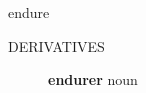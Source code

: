 \documentclass[avery5372, grid]{flashcards}
\begin{document}
\begin{flashcard}{\Huge endure}
\begin{description}
			
			
			
			
			
			
			
			
		\item[\textsc{DERIVATIVES}] \textbf{en\textbullet dur\textbullet er} noun
	\end{description}
\end{flashcard}







				
\end{document}
